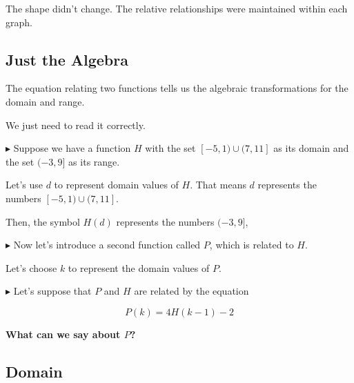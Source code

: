 \documentclass{ximera}
\begin{document}
The shape didn't change.  The relative relationships were maintained within each graph.



























\subsection*{Just the Algebra}











The equation relating two functions tells us the algebraic transformations for the domain and range. 

We just need to read it correctly. 



\textbf{\textcolor{blue!55!black}{$\blacktriangleright$}}  Suppose we have a function $H$ with the set $[-5, 1) \cup (7, 11]$ as its domain and the set $(-3, 9]$ as its range. 

Let's use $d$ to represent domain values of $H$.  That means $d$ represents the numbers $[-5, 1) \cup (7, 11]$. 

Then, the symbol $H(d)$ represents the numbers $(-3, 9]$, 


\textbf{\textcolor{blue!55!black}{$\blacktriangleright$}} Now let's introduce a second function called $P$, which is related to $H$. 

Let's choose $k$ to represent the domain values of $P$. 


\textbf{\textcolor{blue!55!black}{$\blacktriangleright$}} Let's suppose that $P$ and $H$ are related by the equation 

\[ 
P(k) = 4 H(k-1) - 2
\]



\textbf{\textcolor{blue!55!black}{What can we say about $P$?}}  



\subsection*{Domain}
\end{document}
